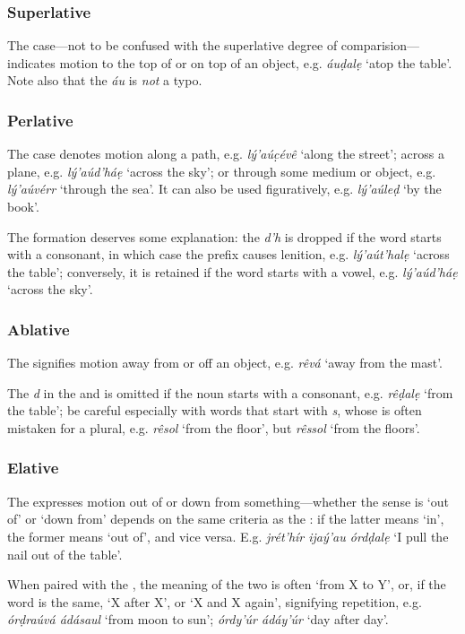 \documentclass[a4paper, 12pt, twoside, final]{article}
\let \w \textit
\begin{document}
\subsubsection{Superlative}
The  case—not to be confused with the superlative degree of comparision—indicates motion to the top of or on
top of an object, e.g. \w{áuḍalẹ} ‘atop the table’. Note also that the \w{áu} is \textit{not} a typo.

\subsubsection{Perlative}
The  case denotes motion along a path, e.g. \w{lý’aúc̣évê} ‘along the street’; across a plane, e.g. \w{lý’aúd’háẹ}
‘across the sky’; or through some medium or object, e.g. \w{lý’aúvérr} ‘through the sea’. It can also be used figuratively,
e.g. \w{lý’aúleḍ} ‘by the book’.

The formation  deserves some explanation: the \w{d’h} is dropped if the word starts with a consonant, in
which case the prefix causes lenition, e.g. \w{lý’aút’halẹ} ‘across the table’; conversely, it is retained if the word
starts with a vowel, e.g. \w{lý’aúd’háẹ} ‘across the sky’.

\subsubsection{Ablative}
The  signifies motion away from or off an object, e.g. \w{rêvá} ‘away from the mast’.

The \w{d} in the  and is omitted if the noun starts with a consonant, e.g. \w{rêḍalẹ} ‘from the table’; be
careful especially with words that start with \w{s}, whose  is often mistaken for a plural, e.g. \w{rêsol}
‘from the floor’, but \w{rêssol} ‘from the floors’.

\subsubsection{Elative}
The  expresses motion out of or down from something—whether the sense is ‘out of’ or ‘down from’ depends on the
same criteria as the : if the latter means ‘in’, the former means ‘out of’, and vice versa. E.g.
\w{jrét’hír ijaý’au órdḍalẹ} ‘I pull the nail out of the table’.

When paired with the , the meaning of the two is often ‘from X to Y’, or, if the word is the same, ‘X after X’,
or ‘X and X again’, signifying repetition, e.g. \w{órḍraúvá ádásaul} ‘from moon to sun’; \w{órdy’úr ádáy’úr} ‘day after
day’.
\end{document}
